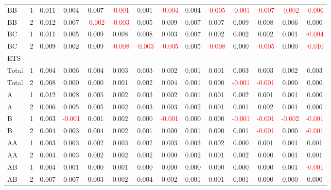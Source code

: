 \begin{table}[H]
{\begin{tabular}{llcccccccccccc}
BB & 1 & 0.011 & 0.004 & 0.007 & \textcolor{red}{-0.001} & 0.001 & \textcolor{red}{-0.004} & 0.004 & \textcolor{red}{-0.005} & \textcolor{red}{-0.001} & \textcolor{red}{-0.007} & \textcolor{red}{-0.002} & \textcolor{red}{-0.006}\\
BB & 2 & 0.012 & 0.007 & \textcolor{red}{-0.002} & \textcolor{red}{-0.003} & 0.005 & 0.009 & 0.007 & 0.007 & 0.009 & 0.008 & 0.006 & 0.000\\
BC & 1 & 0.011 & 0.005 & 0.009 & 0.008 & 0.008 & 0.003 & 0.007 & 0.002 & 0.002 & 0.002 & 0.001 & \textcolor{red}{-0.004}\\
BC & 2 & 0.009 & 0.002 & 0.009 & \textcolor{red}{-0.008} & \textcolor{red}{-0.003} & \textcolor{red}{-0.005} & 0.005 & \textcolor{red}{-0.008} & 0.000 & \textcolor{red}{-0.005} & 0.000 & \textcolor{red}{-0.010}\\
\hline
ETS &  &  &  &  &  &  &  &  &  &  &  &  & \\
\hline
Total & 1 & 0.004 & 0.006 & 0.004 & 0.003 & 0.003 & 0.002 & 0.001 & 0.001 & 0.003 & 0.003 & 0.002 & 0.003\\
Total & 2 & 0.008 & 0.000 & 0.000 & 0.001 & 0.002 & 0.004 & 0.001 & 0.000 & \textcolor{red}{-0.001} & \textcolor{red}{-0.001} & 0.000 & 0.000\\
A & 1 & 0.012 & 0.008 & 0.005 & 0.002 & 0.003 & 0.002 & 0.001 & 0.001 & 0.002 & 0.001 & 0.001 & 0.000\\
A & 2 & 0.006 & 0.005 & 0.005 & 0.002 & 0.003 & 0.003 & 0.002 & 0.001 & 0.001 & 0.002 & 0.001 & 0.000\\
B & 1 & 0.003 & \textcolor{red}{-0.001} & 0.001 & 0.002 & 0.000 & \textcolor{red}{-0.001} & 0.000 & 0.000 & \textcolor{red}{-0.001} & \textcolor{red}{-0.001} & \textcolor{red}{-0.002} & \textcolor{red}{-0.001}\\
B & 2 & 0.004 & 0.003 & 0.004 & 0.002 & 0.001 & 0.000 & 0.001 & 0.000 & 0.001 & \textcolor{red}{-0.001} & 0.000 & \textcolor{red}{-0.001}\\
AA & 1 & 0.003 & 0.003 & 0.002 & 0.003 & 0.002 & 0.003 & 0.003 & 0.002 & 0.000 & 0.001 & 0.001 & 0.001\\
AA & 2 & 0.004 & 0.003 & 0.002 & 0.002 & 0.002 & 0.000 & 0.002 & 0.001 & 0.002 & 0.000 & 0.001 & 0.001\\
AB & 1 & 0.004 & 0.001 & 0.000 & 0.001 & 0.000 & 0.000 & 0.000 & 0.000 & 0.000 & 0.000 & 0.001 & \textcolor{red}{-0.001}\\
AB & 2 & 0.007 & 0.007 & 0.003 & 0.002 & 0.004 & 0.002 & 0.001 & 0.001 & 0.001 & 0.000 & 0.000 & 0.000\\

\end{tabular}}
\end{table}
